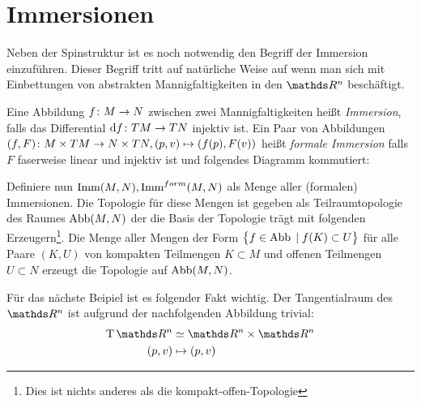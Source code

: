 



\section{Immersionen}
\label{sec:Immersionen}
Neben der Spinstruktur ist es noch notwendig den Begriff der Immersion 
einzuführen. Dieser Begriff tritt auf natürliche Weise auf wenn man sich
mit Einbettungen von abstrakten Mannigfaltigkeiten in den $ \R^n $ beschäftigt.

\begin{Def}
	\label{formIso}
	Eine Abbildung $f \colon M \rightarrow N$ zwischen zwei Mannigfaltigkeiten
	heißt \textit{Immersion}, falls das Differential $\mathrm{d} f \colon TM \rightarrow TN$ 
	injektiv ist.
	Ein Paar von Abbildungen $\abb{(f,F)}{M \times TM}{N \times TN} ,%
	(p,v) \mapsto (f(p),F(v))$ heißt \textit{formale Immersion} falls $ F $ faserweise linear und injektiv ist und folgendes
	Diagramm kommutiert:
	\begin{center}
		
		
	\end{center}
	
	Definiere nun $\operatorname{Imm}(M,N),\operatorname{Imm}^{form}(M,N)$ als Menge aller (formalen) Immersionen. Die Topologie für diese Mengen ist gegeben als Teilraumtopologie des Raumes $\operatorname{Abb}(M,N)$ der die Basis der Topologie 
	trägt mit folgenden Erzeugern\footnote{Dies ist nichts anderes als die kompakt-offen-Topologie}. Die Menge aller Mengen der Form $\bigl\{ f \in \operatorname{Abb} \; | \;  f(K) \subset U \bigr\}$
	für alle Paare $(K,U)$ von kompakten Teilmengen $K \subset M$ und
	offenen Teilmengen $U \subset N$ erzeugt die Topologie auf $\operatorname{Abb}(M,N)$.
\end{Def}


Für das nächste Beipiel ist es folgender Fakt wichtig. Der Tangentialraum des $\R^n$ ist aufgrund der nachfolgenden Abbildung trivial:
\begin{align*}
\TT\R^n &\simeq \R^n \times \R^n \\
(p,v) &\mapsto (p,v)
\end{align*}

